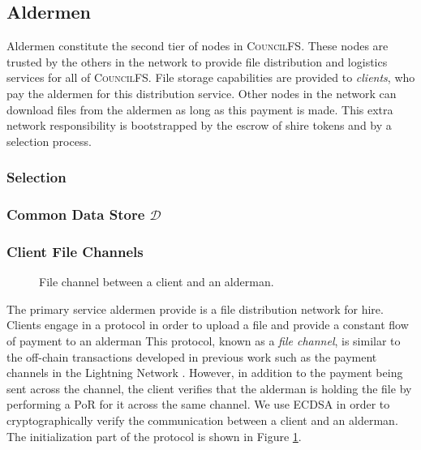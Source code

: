\documentclass{article}
\begin{document}
\subsection{Aldermen}

Aldermen constitute the second tier of nodes in \textsc{CouncilFS}. These nodes
are trusted by the others in the network to provide file distribution and
logistics services for all of \textsc{CouncilFS}. File storage capabilities are
provided to \emph{clients}, who pay the aldermen for this distribution service.
Other nodes in the network can download files from the aldermen as long as this
payment is made. This extra network responsibility is bootstrapped by the escrow
of shire tokens and by a selection process.

\subsubsection{Selection}

\subsubsection{Common Data Store $\mathcal{D}$}

\subsubsection{Client File Channels}

\begin{figure}[t]
  \centering
  \fbox{\rule[-.5cm]{4cm}{4cm} \rule[-.5cm]{4cm}{0cm}}
  \caption{File channel between a client and an alderman.}
  \label{fig:channel}
\end{figure}

The primary service aldermen provide is a file distribution network for hire.
Clients engage in a protocol in order to upload a file and provide a constant
flow of payment to an alderman This
protocol, known as a \emph{file channel}, is similar to the off-chain
transactions developed in previous work such as the payment channels in the
Lightning Network \cite{lightning}. However, in addition to the payment being
sent across the channel, the client verifies that the alderman is holding the
file by performing a PoR for it across the same channel. We use ECDSA in order
to cryptographically verify the communication between a client and an alderman.
The initialization part of the protocol is shown in Figure \ref{fig:channel}.
\end{document}
